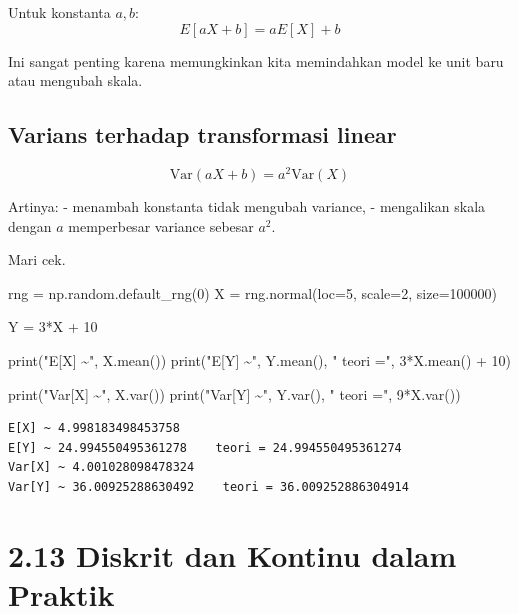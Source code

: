 \documentclass[
  letterpaper,
  DIV=11,
  numbers=noendperiod]{scrreprt}
\newenvironment{Shaded}{\begin{snugshade}}{\end{snugshade}}
\newcommand{\BuiltInTok}[1]{\textcolor[rgb]{0.00,0.23,0.31}{#1}}
\newcommand{\DecValTok}[1]{\textcolor[rgb]{0.68,0.00,0.00}{#1}}
\newcommand{\NormalTok}[1]{\textcolor[rgb]{0.00,0.23,0.31}{#1}}
\newcommand{\OperatorTok}[1]{\textcolor[rgb]{0.37,0.37,0.37}{#1}}
\newcommand{\StringTok}[1]{\textcolor[rgb]{0.13,0.47,0.30}{#1}}
\begin{document}
Untuk konstanta \(a,b\): \[
E[aX+b] = aE[X]+b
\]

Ini sangat penting karena memungkinkan kita memindahkan model ke unit
baru atau mengubah skala.

\subsection{Varians terhadap transformasi
linear}\label{varians-terhadap-transformasi-linear}

\[
\mathrm{Var}(aX+b)=a^2 \mathrm{Var}(X)
\]

Artinya: - menambah konstanta tidak mengubah variance, - mengalikan
skala dengan \(a\) memperbesar variance sebesar \(a^2\).

Mari cek.

\begin{Shaded}
\begin{Highlighting}[]
\NormalTok{rng }\OperatorTok{=}\NormalTok{ np.random.default\_rng(}\DecValTok{0}\NormalTok{)}
\NormalTok{X }\OperatorTok{=}\NormalTok{ rng.normal(loc}\OperatorTok{=}\DecValTok{5}\NormalTok{, scale}\OperatorTok{=}\DecValTok{2}\NormalTok{, size}\OperatorTok{=}\DecValTok{100000}\NormalTok{)}

\NormalTok{Y }\OperatorTok{=} \DecValTok{3}\OperatorTok{*}\NormalTok{X }\OperatorTok{+} \DecValTok{10}

\BuiltInTok{print}\NormalTok{(}\StringTok{"E[X] \textasciitilde{}"}\NormalTok{, X.mean())}
\BuiltInTok{print}\NormalTok{(}\StringTok{"E[Y] \textasciitilde{}"}\NormalTok{, Y.mean(), }\StringTok{"   teori ="}\NormalTok{, }\DecValTok{3}\OperatorTok{*}\NormalTok{X.mean() }\OperatorTok{+} \DecValTok{10}\NormalTok{)}

\BuiltInTok{print}\NormalTok{(}\StringTok{"Var[X] \textasciitilde{}"}\NormalTok{, X.var())}
\BuiltInTok{print}\NormalTok{(}\StringTok{"Var[Y] \textasciitilde{}"}\NormalTok{, Y.var(), }\StringTok{"   teori ="}\NormalTok{, }\DecValTok{9}\OperatorTok{*}\NormalTok{X.var())}
\end{Highlighting}
\end{Shaded}

\begin{verbatim}
E[X] ~ 4.998183498453758
E[Y] ~ 24.994550495361278    teori = 24.994550495361274
Var[X] ~ 4.001028098478324
Var[Y] ~ 36.00925288630492    teori = 36.009252886304914
\end{verbatim}

\section{2.13 Diskrit dan Kontinu dalam
Praktik}\label{diskrit-dan-kontinu-dalam-praktik}
\end{document}
